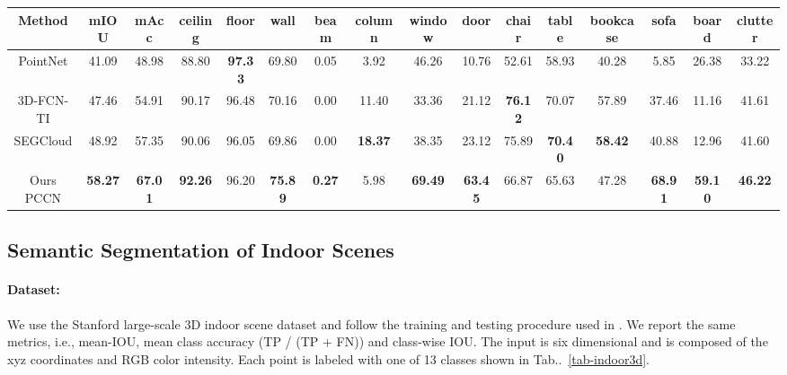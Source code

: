 \documentclass[10pt,twocolumn,letterpaper]{article}
\makeatletter
\def\@onedot{\ifx\@let@token.\else.\null\fi\xspace}
\DeclareRobustCommand\onedot{\futurelet\@let@token\@onedot}
\newcommand{\tabref}[1]{Tab\onedot~\ref{#1}}
\makeatother
\begin{document}
\begin{table*}[]
\centering
\footnotesize
\setlength\tabcolsep{4pt} \begin{tabular}{c|cc|ccccccccccccc}
Method           				  &  \cellcolor{blue!25} \textbf{mIOU} & \cellcolor{blue!25}  \textbf{mAcc}     & ceiling        & floor          & wall           & beam          & column        & window         & door           & chair          & table          & bookcase       & sofa           & board          & clutter        \\ \hline
PointNet  \cite{pointnet}         &  \cellcolor{blue!25}41.09          &  \cellcolor{blue!25}48.98          	& 88.80          & \textbf{97.33} & 69.80          & 0.05          & 3.92           & 46.26          & 10.76          & 52.61          & 58.93          & 40.28          & 5.85           & 26.38          & 33.22          \\
3D-FCN-TI  \cite{segcloud}        &  \cellcolor{blue!25}47.46          & \cellcolor{blue!25} 54.91          	& {90.17} 		 & 96.48          & 70.16          & 0.00          & 11.40          & 33.36          & 21.12          & \textbf{76.12} & 70.07          & 57.89          & 37.46          & 11.16          & 41.61          \\
SEGCloud   \cite{segcloud}        & \cellcolor{blue!25} 48.92          &  \cellcolor{blue!25}57.35          	& 90.06          & 96.05          & 69.86          & 0.00          & \textbf{18.37} & 38.35          & 23.12          & 75.89          & \textbf{70.40} & \textbf{58.42} & 40.88          & 12.96          & {41.60} \\ \hline
Ours PCCN         				  & \cellcolor{blue!25} \textbf{58.27} & \cellcolor{blue!25} \textbf{67.01} 	& \textbf{92.26} & {96.20} & \textbf{75.89} & \textbf{0.27} & {5.98} & \textbf{69.49} & \textbf{63.45} & {66.87} & 65.63 & 47.28 & \textbf{68.91} & \textbf{59.10} & \textbf{46.22} \\
\end{tabular}
\vspace{-3mm}
\caption{Semantic Segmentation Results on Stanford Large-Scale 3D Indoor Scene Dataset }
\label{tab-indoor3d}
\end{table*}
\subsection{Semantic Segmentation of Indoor  Scenes} 

\paragraph{Dataset:} We use the  Stanford large-scale 3D indoor scene dataset \cite{indoor3d} and  follow the training and testing procedure used in \cite{segcloud}.
 We report the same metrics, i.e., mean-IOU, mean class accuracy (TP / (TP + FN)) and class-wise IOU. The input is six dimensional and is composed of   the xyz coordinates and RGB color intensity. Each point is labeled with one of 13 classes shown in \tabref{tab-indoor3d}. 
\end{document}
